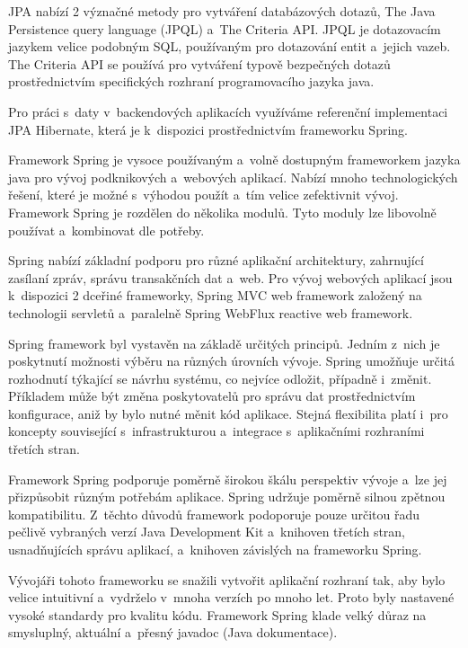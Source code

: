 \documentclass[12pt]{article}
\begin{document}
JPA nabízí 2 význačné metody pro vytváření databázových dotazů, 
The Java Persistence query language (JPQL) a~The Criteria API.
JPQL je dotazovacím jazykem velice podobným SQL, používaným pro dotazování
entit a~jejich vazeb.
The Criteria API se používá pro vytváření typově bezpečných dotazů
prostřednictvím specifických rozhraní programovacího jazyka java.


Pro práci s~daty v~backendových aplikacích využíváme referenční implementaci 
JPA Hibernate, která je k~dispozici prostřednictvím frameworku Spring.


Framework Spring je vysoce používaným a~volně dostupným frameworkem
jazyka java pro vývoj podknikových a~webových aplikací.
Nabízí mnoho technologických řešení, které je možné s~výhodou
použít a~tím velice zefektivnit vývoj.
Framework Spring je rozdělen do několika modulů.
Tyto moduly lze libovolně používat a~kombinovat dle potřeby.

Spring nabízí základní podporu pro různé aplikační architektury,
zahrnující zasílaní zpráv, správu transakčních dat a~web.
Pro vývoj webových aplikací jsou k~dispozici 2 dceřiné frameworky,
Spring MVC web framework založený na technologii servletů 
a~paralelně Spring WebFlux reactive web framework.

Spring framework byl vystavěn na základě určitých principů.
Jedním z~nich je poskytnutí možnosti výběru na různých úrovních vývoje.
Spring umožňuje určitá rozhodnutí týkající se návrhu systému, 
co nejvíce odložit, případně i~změnit.
Příkladem může být změna poskytovatelů 
pro správu dat prostřednictvím konfigurace,
aniž by bylo nutné měnit kód aplikace.
Stejná flexibilita platí i~pro koncepty související s~infrastrukturou 
a~integrace s~aplikačními rozhraními třetích stran.

Framework Spring podporuje poměrně širokou škálu perspektiv vývoje
a~lze jej přizpůsobit různým potřebám aplikace.
Spring udržuje poměrně silnou zpětnou kompatibilitu. 
Z~těchto důvodů framework podoporuje pouze určitou řadu
pečlivě vybraných verzí Java Development Kit
a~knihoven třetích stran, usnadňujících správu aplikací,
a~knihoven závislých na frameworku Spring.

Vývojáři tohoto frameworku se snažili vytvořit aplikační rozhraní tak,
aby bylo velice intuitivní a~vydrželo v~mnoha verzích po mnoho let.
Proto byly nastavené vysoké standardy pro kvalitu kódu.
Framework Spring klade velký důraz na smysluplný, aktuální a~přesný javadoc
(Java dokumentace).
\end{document}

